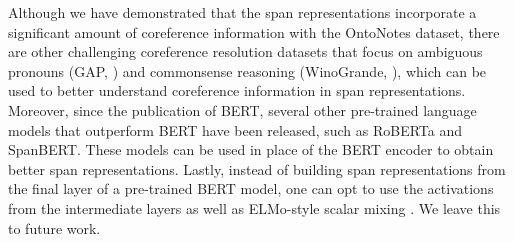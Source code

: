 \documentclass[11pt]{article}
\begin{document}
Although we have demonstrated that the span representations incorporate a significant amount of coreference information with the OntoNotes dataset, there are other challenging coreference resolution datasets that focus on ambiguous pronouns (GAP, \parencite{webster2018gap}) and commonsense reasoning (WinoGrande, \parencite{winogrande}), which can be used to better understand coreference information in span representations.
Moreover, since the publication of BERT, several other pre-trained language models that outperform BERT have been released, such as RoBERTa \parencite{roberta} and SpanBERT\parencite{spanbert}. These models can be used in place of the BERT encoder to obtain better span representations. Lastly, instead of building span representations from the final layer of a pre-trained BERT model, one can opt to use the activations from the intermediate layers as well as ELMo-style scalar mixing \parencite{tenney2019context,peters2018elmo}. We leave this to future work.


\printbibliography
\end{document}
